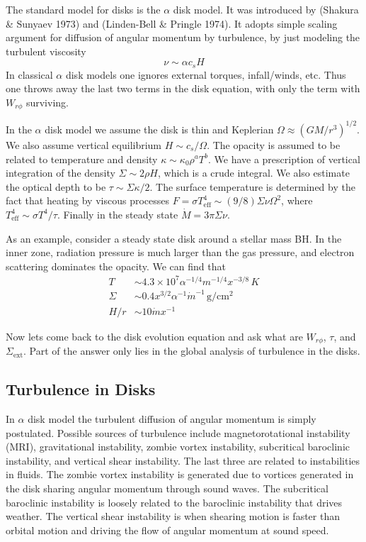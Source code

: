 \documentclass[letterpaper, 11pt]{article}
\numberwithin{equation}{section}
\numberwithin{figure}{section}
\begin{document}
The standard model for disks is the $\alpha$ disk model. It was introduced by
(Shakura \& Sunyaev 1973) and (Linden-Bell \& Pringle 1974). It adopts simple
scaling argument for diffusion of angular momentum by turbulence, by just
modeling the turbulent viscosity
\begin{equation}
  \label{eq:10}
  \nu \sim \alpha c_s H
\end{equation}
In classical $\alpha$ disk models one ignores external torques, infall/winds,
etc. Thus one throws away the last two terms in the disk equation, with only the
term with $W_{r\phi}$ surviving.

In the $\alpha$ disk model we assume the disk is thin and Keplerian $\Omega
\approx (GM/r^3)^{1/2}$. We also assume vertical equilibrium $H \sim
c_s/\Omega$. The opacity is assumed to be related to temperature and density $\kappa \sim
\kappa_0\rho^aT^{b}$. We have a prescription of vertical integration of the
density $\Sigma \sim 2\rho H$, which is a crude integral. We also estimate the
optical depth to be $\tau \sim \Sigma \kappa / 2$. The surface temperature is
determined by the fact that heating by viscous processes $F = \sigma
T_\mathrm{eff}^4 \sim (9/8)\Sigma \nu \Omega^2$, where $T_\mathrm{eff}^4 \sim
\sigma T^4/\tau$. Finally in the steady state $\dot{M} = 3\pi \Sigma \nu$.

As an example, consider a steady state disk around a stellar mass BH. In the
inner zone, radiation pressure is much larger than the gas pressure, and
electron scattering dominates the opacity. We can find that
\begin{align}
  T &\sim 4.3\times 10^7 \alpha^{-1/4}m^{-1/4}x^{-3/8}\,K \\
  \Sigma &\sim 0.4 x^{3/2}\alpha^{-1}\dot{m}^{-1}\,\mathrm{g/cm^2} \\
  H/r &\sim 10 \dot{m}x^{-1}
\end{align}

Now lets come back to the disk evolution equation and ask what are $W_{r\phi}$,
$\tau$, and $\Sigma_\mathrm{ext}$. Part of the answer only lies in the global
analysis of turbulence in the disks.

\subsection{Turbulence in Disks}

In $\alpha$ disk model the turbulent diffusion of angular momentum is simply
postulated. Possible sources of turbulence include magnetorotational instability
(MRI), gravitational instability, zombie vortex instability, subcritical
baroclinic instability, and vertical shear instability. The last three are
related to instabilities in fluids. The zombie vortex instability is generated
due to vortices generated in the disk sharing angular momentum through sound
waves. The subcritical baroclinic instability is loosely related to the
baroclinic instability that drives weather. The vertical shear instability is
when shearing motion is faster than orbital motion and driving the flow of
angular momentum at sound speed.
\end{document}
